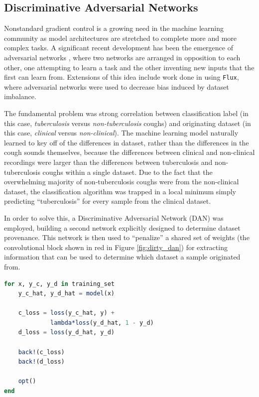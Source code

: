 \documentclass{juliacon}
\begin{document}
\subsection{Discriminative Adversarial Networks}

Nonstandard gradient control is a growing need in the machine learning community as model architectures are stretched to complete more and more complex tasks.  A significant recent development has been the emergence of adversarial networks \cite{GANs}, where two networks are arranged in opposition to each other, one attempting to learn a task and the other inventing new inputs that the first can learn from.  Extensions of this idea include work done in \cite{Saba2018} using \texttt{Flux}, where adversarial networks were used to decrease bias induced by dataset imbalance.

The fundamental problem was strong correlation between classification label (in this case, \textit{tuberculosis} versus \textit{non-tuberculosis} coughs) and originating dataset (in this case, \textit{clinical} versus \textit{non-clinical}).  The machine learning model naturally learned to key off of the differences in dataset, rather than the differences in the cough sounds themselves, because the differences between clinical and non-clinical recordings were larger than the differences between tuberculosis and non-tuberculosis coughs within a single dataset.  Due to the fact that the overwhelming majority of non-tuberculosis coughs were from the non-clinical dataset, the classification algorithm was trapped in a local minimum simply predicting ``tuberculosis'' for every sample from the clinical dataset.

In order to solve this, a Discriminative Adversarial Network (DAN) was employed, building a second network explicitly designed to determine dataset provenance.  This network is then used to ``penalize'' a shared set of weights (the convolutional block shown in red in Figure \ref{fig:dirty_dan}) for extracting information that can be used to determine which dataset a sample originated from.

\begin{lstlisting}[language = Julia,
                  label={lst:dirty_dan_training_loop},
                  caption={DAN training loop},
                  captionpos=b]
for x, y_c, y_d in training_set
    y_c_hat, y_d_hat = model(x)

    c_loss = loss(y_c_hat, y) +
             lambda*loss(y_d_hat, 1 - y_d)
    d_loss = loss(y_d_hat, y_d)
    
    back!(c_loss)
    back!(d_loss)
    
    opt()
end
\end{lstlisting}
\end{document}
